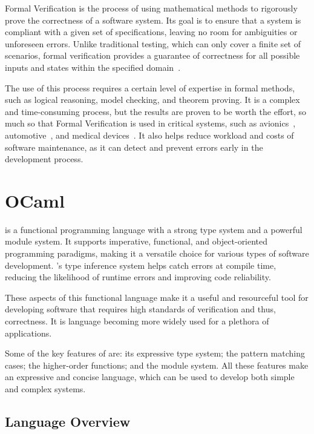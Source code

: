 Formal Verification is the process of using mathematical methods to rigorously 
prove the correctness of a software system. Its goal is to ensure that a system 
is compliant with a given set of specifications, leaving no room for ambiguities or 
unforeseen errors. Unlike traditional testing, which can only cover a 
finite set of scenarios, formal verification provides a guarantee of 
correctness for all possible inputs and states within the specified domain~\cite{Brian_Polgreen2025}.

The use of this process requires a certain level of expertise in formal methods, such as 
logical reasoning, model checking, and theorem proving. It is a complex and time-consuming 
process, but the results are proven to be worth the effort, so much so that Formal Verification 
is used in critical systems, such as avionics~\cite{Yin_Yongfeng2010}, automotive~\cite{Rajabli2021}, 
and medical devices~\cite{Bezerra_Jonas_Santos2016}. It also helps reduce workload and costs 
of software maintenance, as it can detect and prevent errors early in the development process.

\section{OCaml}
\label{sec:ocaml}

\ocaml is a functional programming language with a strong type system and a powerful
module system. It supports imperative, functional, and object-oriented programming 
paradigms, making it a versatile choice for various types of software development. 
\ocaml's type inference system helps catch errors at compile time, reducing the 
likelihood of runtime errors and improving code reliability.

These aspects of this functional language make it a useful and resourceful tool 
for developing software that requires high standards of verification and thus, correctness.
It is language becoming more widely used for a plethora of applications.

Some of the key features of \ocaml are: its expressive type system; the pattern matching cases; 
the higher-order functions; and the module system. All these features make \ocaml an expressive 
and concise language, which can be used to develop both simple and complex systems.

\subsection{Language Overview} %
\label{sub:language_overview}

